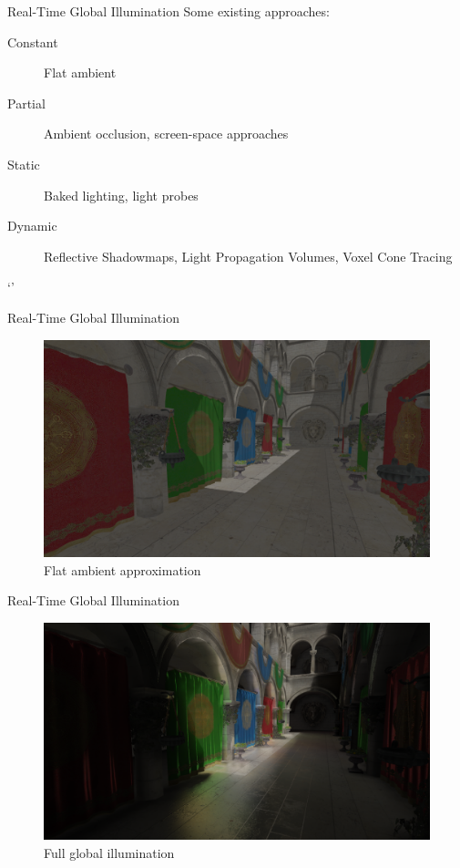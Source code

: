 \documentclass[10pt]{beamer}
\begin{document}
\begin{frame}{Real-Time Global Illumination}
  Some existing approaches:

  \begin{description}
    \item[Constant] Flat ambient %
    \item[Partial] Ambient occlusion, screen-space approaches %
    \item[Static] Baked lighting, light probes
    \item[Dynamic] Reflective Shadowmaps, Light Propagation Volumes, Voxel Cone Tracing
  \end{description}
\end{frame}`'

\begin{frame}{Real-Time Global Illumination}
  \begin{figure}
    \includegraphics[width=\textwidth]{gi_off.png}
    \caption*{Flat ambient approximation}
  \end{figure}
\end{frame}

\begin{frame}{Real-Time Global Illumination}
  \begin{figure}
    \includegraphics[width=\textwidth]{gi_on.png}
    \caption*{Full global illumination}
  \end{figure}
\end{frame}
\end{document}
